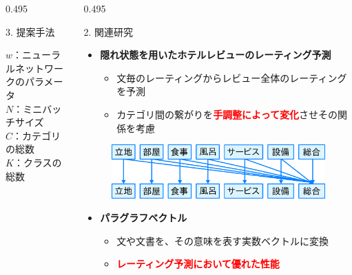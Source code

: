 \documentclass[unicode,10pt]{beamer}
\newcommand{\mycolumnwidth}{0.495\textwidth}
\newcommand{\itemtitle}[1]{\textbf{#1}\\}
\newcommand{\fire}[1]{\textcolor{red}{\textbf{#1}}}
\begin{document}
\begin{frame}
\begin{columns}[onlytextwidth,t]
\begin{column}{\mycolumnwidth}
\begin{block}{3. 提案手法}
\begin{itemize}
{          %
          $w$：ニューラルネットワークのパラメータ \\
          $N$：ミニバッチサイズ \\
          $C$：カテゴリの総数 \\
          $K$：クラスの総数 \\
        }
    \end{itemize}
  \end{block}
\end{column}

\begin{column}{\mycolumnwidth}
  \begin{block}{2. 関連研究}
    \begin{itemize}
      \item \itemtitle{隠れ状態を用いたホテルレビューのレーティング予測
                       \cite{fujitani15}}
        \begin{itemize}
          \item 文毎のレーティングからレビュー全体のレーティングを予測
          \item カテゴリ間の繋がりを\fire{手調整によって変化}させその関係を考慮
        \end{itemize}
    \end{itemize}
    \begin{figure}
      \includegraphics[width=0.7\linewidth]
          {fig/fujitani_miml_relations_among_rating_categories.pdf}
    \end{figure}
    \begin{itemize}
      \item \itemtitle{パラグラフベクトル\cite{quoc14}}
        \begin{itemize}
          \item 文や文書を、その意味を表す実数ベクトルに変換
          \item \fire{レーティング予測において優れた性能}
        \end{itemize}

\end{itemize}
\end{block}
\end{column}
\end{columns}
\end{frame}
\end{document}
